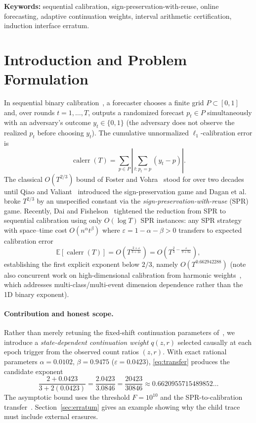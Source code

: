 \documentclass[11pt,letterpaper]{article}
\theoremstyle{definition}
\theoremstyle{remark}
\newcommand{\E}{\mathbb{E}}
\newcommand{\calerr}{\operatorname{calerr}}
\begin{document}
\vspace{0.10in}
\noindent\textbf{Keywords:} sequential calibration, sign-preservation-with-reuse, online forecasting, adaptive continuation weights, interval arithmetic certification, induction interface erratum.
\clearpage
\tableofcontents
\clearpage

\section{Introduction and Problem Formulation}
In sequential binary calibration~\cite{FosterVohra1998}, a forecaster chooses a finite grid $P \subset [0,1]$ and, over rounds $t=1,\dots,T$, outputs a randomized forecast $p_t \in P$ simultaneously with an adversary's outcome $y_t \in \{0,1\}$ (the adversary does not observe the realized $p_t$ before choosing $y_t$). The cumulative unnormalized $\ell_1$-calibration error is
\begin{equation}\label{eq:calerr}
  \calerr(T) = \sum_{p \in P} \left| \sum_{t: p_t = p} (y_t - p) \right|.
\end{equation}
The classical $O(T^{2/3})$ bound of Foster and Vohra~\cite{FosterVohra1998} stood for over two decades until Qiao and Valiant~\cite{QiaoValiant2021} introduced the sign-preservation game and Dagan et al.~\cite{Dagan2024} broke $T^{2/3}$ by an unspecified constant via the \emph{sign-preservation-with-reuse} (SPR) game. Recently, Dai and Fishelson~\cite{DaiFishelson2026} tightened the reduction from SPR to sequential calibration using only $O(\log T)$ SPR instances: any SPR strategy with space--time cost $O(n^\alpha t^\beta)$ where $\varepsilon = 1 - \alpha - \beta > 0$ transfers to expected calibration error
\begin{equation}\label{eq:transfer}
  \E[\calerr(T)] = O\!\left(T^{\frac{2+\varepsilon}{3+2\varepsilon}}\right) = O\!\left(T^{\frac{2}{3} - \frac{\varepsilon}{9+6\varepsilon}}\right),
\end{equation}
establishing the first explicit exponent below $2/3$, namely $O(T^{0.662942288})$ (note also concurrent work on high-dimensional calibration from harmonic weights~\cite{FishelsonMohri2026}, which addresses multi-class/multi-event dimension dependence rather than the 1D binary exponent).

\paragraph{Contribution and honest scope.}
Rather than merely retuning the fixed-shift continuation parameters of~\cite{DaiFishelson2026}, we introduce a \emph{state-dependent continuation weight} $q(z,r)$ selected causally at each epoch trigger from the observed count ratios $(z,r)$. With exact rational parameters $\alpha = 0.0102$, $\beta = 0.9475$ ($\varepsilon = 0.0423$), \eqref{eq:transfer} produces the candidate exponent
\[
  \frac{2 + 0.0423}{3 + 2(0.0423)} = \frac{2.0423}{3.0846} = \frac{20423}{30846} \approx 0.6620955715489852\dots
\]
The asymptotic bound uses the threshold $F=10^{10}$ and the SPR-to-calibration transfer~\cite{DaiFishelson2026}. Section~\ref{sec:erratum} gives an example showing why the child trace must include external erasures.
\end{document}
